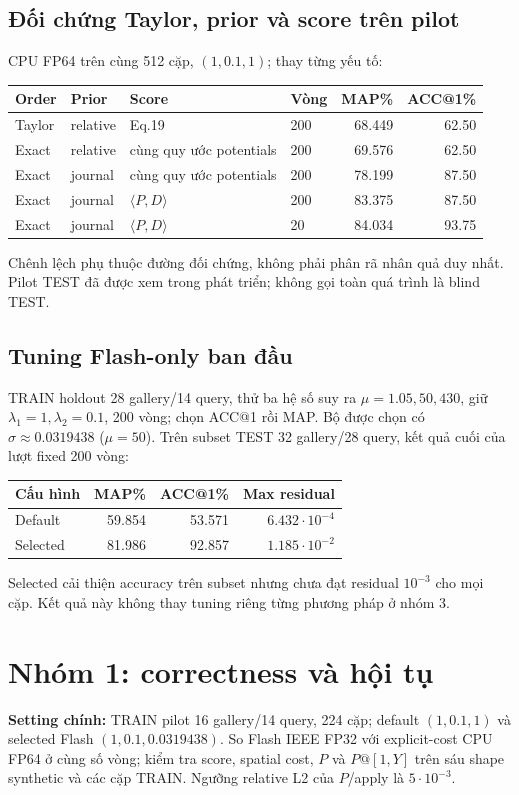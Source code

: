 \documentclass[11pt,a4paper]{article}
\begin{document}
\subsection{Đối chứng Taylor, prior và score trên pilot}
CPU FP64 trên cùng 512 cặp, $(1,0.1,1)$; thay từng yếu tố:
\begin{center}\small
\begin{tabular}{@{}llllrr@{}}
\toprule
Order & Prior & Score & Vòng & MAP\% & ACC@1\% \\
\midrule
Taylor & relative & Eq.19 & 200 & 68.449 & 62.50 \\
Exact & relative & cùng quy ước potentials & 200 & 69.576 & 62.50 \\
Exact & journal & cùng quy ước potentials & 200 & 78.199 & 87.50 \\
Exact & journal & $\langle P,D\rangle$ & 200 & 83.375 & 87.50 \\
Exact & journal & $\langle P,D\rangle$ & 20 & 84.034 & 93.75 \\
\bottomrule
\end{tabular}
\end{center}
Chênh lệch phụ thuộc đường đối chứng, không phải phân rã nhân quả duy nhất.
Pilot TEST đã được xem trong phát triển; không gọi toàn quá trình là blind TEST.

\subsection{Tuning Flash-only ban đầu}
TRAIN holdout 28 gallery/14 query, thử ba hệ số suy ra $\mu=1.05,50,430$,
giữ $\lambda_1=1,\lambda_2=0.1$, 200 vòng; chọn ACC@1 rồi MAP.
Bộ được chọn có $\sigma\approx0.0319438$ ($\mu=50$).
Trên subset TEST 32 gallery/28 query, kết quả cuối của lượt fixed 200 vòng:
\begin{center}\small
\begin{tabular}{@{}lrrr@{}}
\toprule
Cấu hình & MAP\% & ACC@1\% & Max residual \\
\midrule
Default & 59.854 & 53.571 & $6.432\cdot10^{-4}$ \\
Selected & 81.986 & 92.857 & $1.185\cdot10^{-2}$ \\
\bottomrule
\end{tabular}
\end{center}
Selected cải thiện accuracy trên subset nhưng chưa đạt residual $10^{-3}$
cho mọi cặp. Kết quả này không thay tuning riêng từng phương pháp ở nhóm 3.

\section{Nhóm 1: correctness và hội tụ}
\label{sec:g1}
\textbf{Setting chính:} TRAIN pilot 16 gallery/14 query, 224 cặp;
default $(1,0.1,1)$ và selected Flash $(1,0.1,0.0319438)$.
So Flash IEEE FP32 với explicit-cost CPU FP64 ở cùng số vòng;
kiểm tra score, spatial cost, $P$ và $P@[1,Y]$ trên sáu shape synthetic
và các cặp TRAIN. Ngưỡng relative L2 của $P$/apply là $5\cdot10^{-3}$.
\end{document}
